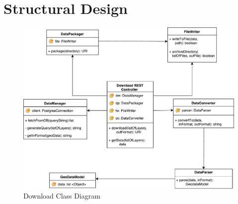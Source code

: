 \documentclass{article}
\begin{document}
	\clearpage
	
	\section{Structural Design}
	
	\begin{figure}[H]
		\begin{center}
			\caption{Download Class Diagram}
			\includegraphics[width=\textwidth]{images/class_diagram.pdf}
		\end{center}
	\end{figure}
	
	
\end{document}
